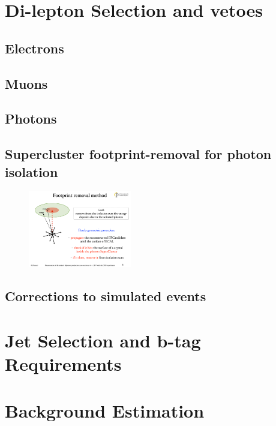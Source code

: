 \section{Di-lepton Selection and vetoes}

\subsection{Electrons}

\subsection{Muons}

\subsection{Photons}

\subsection{Supercluster footprint-removal for photon isolation}

\begin{figure} \label{fig-SCFR}
\begin{center}
\includegraphics[width=0.4\textwidth]{Figures/RandomCone3.pdf}
\caption{}
\end{center}
\end{figure}

\subsection{Corrections to simulated events}

\section{Jet Selection and b-tag Requirements}

\section{Background Estimation}

